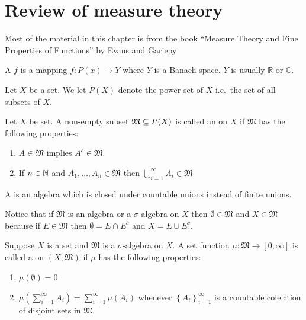 \chapter{Review of measure theory}

Most of the material in this chapter is from the book ``Measure Theory
and Fine Properties of Functions'' by Evans and Gariepy
\cite{evans1991measure}

\begin{defn}
  A  $f$ is a mapping $f:P(x) \to Y$ where $Y$ is a
  Banach space. $Y$ is usually $\mathbb{R}$ or $\mathbb{C}$.
\end{defn}

\begin{defn}
  Let $X$ be a set. We let $P(X)$ denote the power set of $X$ i.e.\ the
  set of all subsets of $X$.
\end{defn}

\begin{defn}
  Let $X$ be set. A non-empty subset $\mathfrak{M}\subseteq P(X)$ is called an
   on $X$ if $\mathfrak{M}$ has the following properties:
  \begin{enumerate}
    \item $A\in \mathfrak{M}$ implies $A^c\in \mathfrak{M}$.
    \item If $n\in \mathbb{N}$ and $A_1,\ldots,A_n\in \mathfrak{M}$ then $
      \bigcup_{i=1}^\infty A_i\in \mathfrak{M}$  
  \end{enumerate}
  A  is an algebra which is closed under countable
  unions instead of finite unions.
\end{defn}

\begin{remark}
  Notice that if $\mathfrak{M}$ is an algebra or a $\sigma$-algebra on
  $X$ then $\emptyset\in \mathfrak{M}$ and $X\in \mathfrak{M}$ because
  if $E\in \mathfrak{M}$ then $\emptyset = E\cap E^{c}$ and $X = E\cup
  E^c$.
\end{remark}

\begin{defn}
  Suppose $X$ is a set and $\mathfrak{M}$ is a $\sigma$-algebra on
  $X$. A set function $\mu: \mathfrak{M} \to [0,\infty]$ is called a
   on $(X, \mathfrak{M})$ if $\mu$ has the following
  properties:
  \begin{enumerate}
    \item $\mu(\emptyset)=0$
    \item $\mu\left( \sum_{i=1}^\infty A_i \right) =
      \sum_{i=1}^\infty\mu(A_i)$ whenever $\left\{ A_i
      \right\}_{i=1}^\infty$ is a countable colelction of disjoint sets
      in $ \mathfrak{M}$.
  \end{enumerate}
\end{defn}

